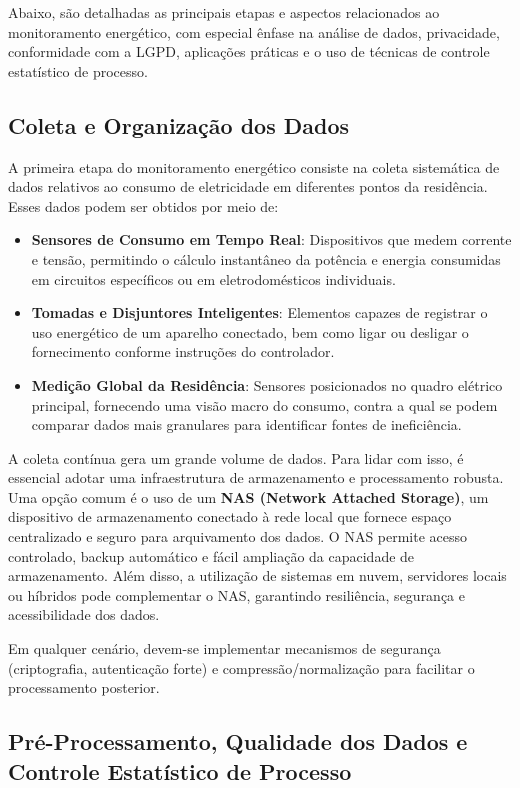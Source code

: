 Abaixo, são detalhadas as principais etapas e aspectos relacionados ao monitoramento energético, com especial ênfase na análise de dados, privacidade, conformidade com a LGPD, aplicações práticas e o uso de técnicas de controle estatístico de processo.
\subsection{Coleta e Organização dos Dados}

A primeira etapa do monitoramento energético consiste na coleta sistemática de dados relativos ao consumo de eletricidade em diferentes pontos da residência. Esses dados podem ser obtidos por meio de:

\begin{itemize}
    \item \textbf{Sensores de Consumo em Tempo Real}: Dispositivos que medem corrente e tensão, permitindo o cálculo instantâneo da potência e energia consumidas em circuitos específicos ou em eletrodomésticos individuais.
    \item \textbf{Tomadas e Disjuntores Inteligentes}: Elementos capazes de registrar o uso energético de um aparelho conectado, bem como ligar ou desligar o fornecimento conforme instruções do controlador.
    \item \textbf{Medição Global da Residência}: Sensores posicionados no quadro elétrico principal, fornecendo uma visão macro do consumo, contra a qual se podem comparar dados mais granulares para identificar fontes de ineficiência.
\end{itemize}

A coleta contínua gera um grande volume de dados. Para lidar com isso, é essencial adotar uma infraestrutura de armazenamento e processamento robusta. Uma opção comum é o uso de um \textbf{NAS (Network Attached Storage)}, um dispositivo de armazenamento conectado à rede local que fornece espaço centralizado e seguro para arquivamento dos dados. O NAS permite acesso controlado, backup automático e fácil ampliação da capacidade de armazenamento. Além disso, a utilização de sistemas em nuvem, servidores locais ou híbridos pode complementar o NAS, garantindo resiliência, segurança e acessibilidade dos dados.

Em qualquer cenário, devem-se implementar mecanismos de segurança (criptografia, autenticação forte) e compressão/normalização para facilitar o processamento posterior.

\subsection{Pré-Processamento, Qualidade dos Dados e Controle Estatístico de Processo}

